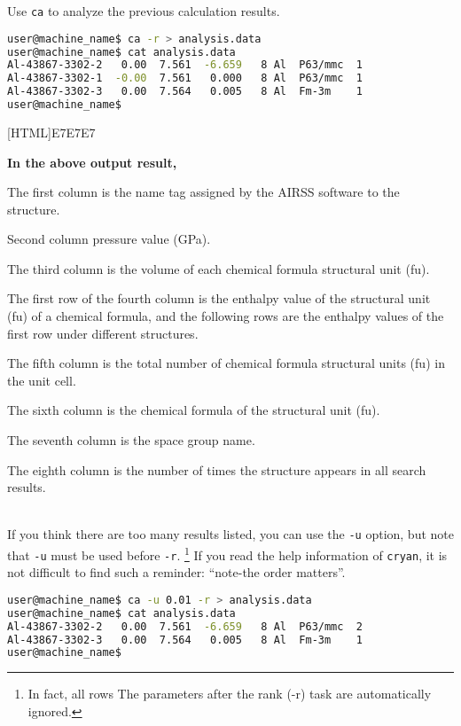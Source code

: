 \documentclass[a4paper, 10pt]{article}
\begin{document}
Use \verb|ca| to analyze the previous calculation results.
\begin{lstlisting}[language={bash}]
user@machine_name$ ca -r > analysis.data
user@machine_name$ cat analysis.data
Al-43867-3302-2   0.00  7.561  -6.659   8 Al  P63/mmc  1
Al-43867-3302-1  -0.00  7.561   0.000   8 Al  P63/mmc  1
Al-43867-3302-3   0.00  7.564   0.005   8 Al  Fm-3m    1
user@machine_name$
\end{lstlisting}

\noindent{}[HTML]{E7E7E7}{\parbox{\textwidth}{%
\noindent \textbf{In the above output result,}
\begin{maineu}
  \item The first column is the name tag assigned by the AIRSS software to the structure.
  \item Second column pressure value (GPa).
  \item The third column is the volume of each chemical formula structural unit (fu).
  \item The first row of the fourth column is the enthalpy value of the structural unit (fu) of a chemical formula, and the following rows are the enthalpy values of the first row under different structures.
  \item The fifth column is the total number of chemical formula structural units (fu) in the unit cell.
  \item The sixth column is the chemical formula of the structural unit (fu).
  \item The seventh column is the space group name.
  \item The eighth column is the number of times the structure appears in all search results.
\end{maineu}}}\\

If you think there are too many results listed, you can use the \verb|-u| option, but note that \verb|-u| must be used before \verb|-r|. \footnote{In fact, all rows The parameters after the rank (-r) task are automatically ignored.} If you read the help information of \verb|cryan|, it is not difficult to find such a reminder: ``note-the order matters''.
\begin{lstlisting}[language={bash}]
user@machine_name$ ca -u 0.01 -r > analysis.data
user@machine_name$ cat analysis.data
Al-43867-3302-2   0.00  7.561  -6.659   8 Al  P63/mmc  2
Al-43867-3302-3   0.00  7.564   0.005   8 Al  Fm-3m    1
user@machine_name$
\end{lstlisting}
\end{document}
